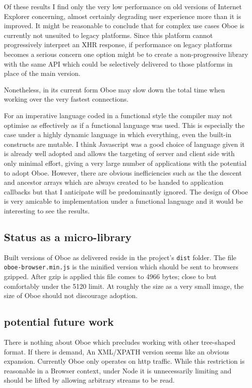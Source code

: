 \documentclass[]{article}
\begin{document}
Of these results I find only the very low performance on old versions of
Internet Explorer concerning, almost certainly degrading user experience
more than it is improved. It might be reasonable to conclude that for
complex use cases Oboe is currently not unsuited to legacy platforms.
Since this platform cannot progressively interpret an XHR response, if
performance on legacy platforms becomes a serious concern one option
might be to create a non-progressive library with the same API which
could be selectively delivered to those platforms in place of the main
version.

Nonetheless, in its current form Oboe may slow down the total time when
working over the very fastest connections.

For an imperative language coded in a functional style the compiler may
not optimise as effectively as if a functional language was used. This
is especially the case under a highly dynamic language in which
everything, even the built-in constructs are mutable. I think Javascript
was a good choice of language given it is already well adopted and
allows the targeting of server and client side with only minimal effort,
giving a very large number of applications with the potential to adopt
Oboe. However, there are obvious inefficiencies such as the the descent
and ancestor arrays which are always created to be handed to application
callbacks but that I anticipate will be predominantly ignored. The
design of Oboe is very amicable to implementation under a functional
language and it would be interesting to see the results.

\subsection{Status as a micro-library}

Built versions of Oboe as delivered reside in the project's
\texttt{dist} folder. The file \texttt{oboe-browser.min.js} is the
minified version which should be sent to browsers gzipped. After gzip is
applied this file comes to 4966 bytes; close to but comfortably under
the 5120 limit. At roughly the size as a very small image, the size of
Oboe should not discourage adoption.

\subsection{potential future work}

There is nothing about Oboe which precludes working with other
tree-shaped format. If there is demand, An XML/XPATH version seems like
an obvious expansion. Currently Oboe only operates on http traffic.
While this restriction is reasonable in a Browser context, under Node it
is unnecessarily limiting and should be lifted by allowing arbitrary
streams to be read.
\end{document}
